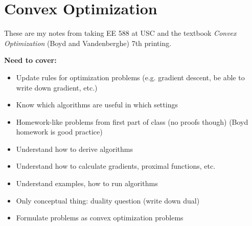 %
%
%
%
%
%
%
%
%

\section{Convex Optimization}

These are my notes from taking EE 588 at USC and the textbook \textit{Convex Optimization} (Boyd and Vandenberghe) 7th printing.

\textbf{Need to cover:}

\begin{itemize}

\item Update rules for optimization problems (e.g. gradient descent, be able to write down gradient, etc.)

\item Know which algorithms are useful in which settings

\item Homework-like problems from first part of class (no proofs though) (Boyd homework is good practice)

\item Understand how to derive algorithms

\item Understand how to calculate gradients, proximal functions, etc.

\item Understand examples, how to run algorithms

\item Only conceptual thing: duality question (write down dual)

\item Formulate problems as convex optimization problems

\end{itemize}

